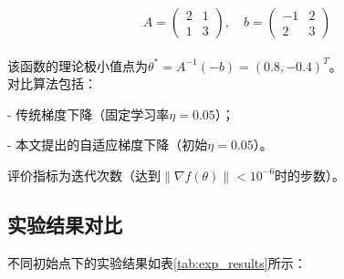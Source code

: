\documentclass[12pt,a4paper,oneside]{article} %
\begin{document}
{\[
A = \begin{pmatrix} 
2 & 1 \\ 
1 & 3 
\end{pmatrix}, \quad b = \begin{pmatrix} 
    -1 & 2 \\
    2  &3 
\end{pmatrix}
\]}\\[0.2cm]
\quad 该函数的理论极小值点为$\theta^* = A^{-1}(-b) = (0.8, -0.4)^T$。
\\对比算法包括：

- 传统梯度下降（固定学习率$\eta=0.05$）；

- 本文提出的自适应梯度下降（初始$\eta=0.05$）。

评价指标为迭代次数（达到$\|\nabla f(\theta)\| < 10^{-6}$时的步数）。

\subsection{实验结果对比}
不同初始点下的实验结果如表\ref{tab:exp_results}所示：

\begin{table}[H] %
    \centering %
    \caption{两种算法的收敛迭代次数对比} %
    \label{tab:exp_results}
\end{table}
\end{document}

